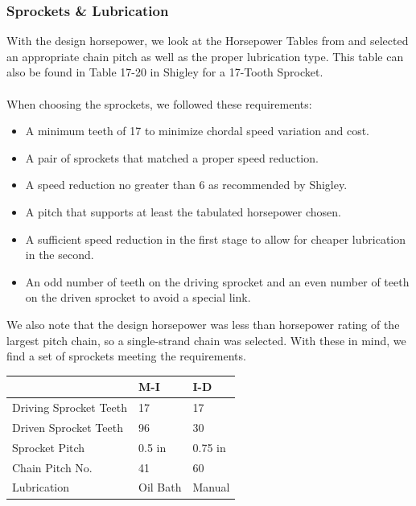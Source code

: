 \documentclass[letterpaper,12pt]{article}
\begin{document}
\subsubsection{Sprockets \& Lubrication}
With the design horsepower, we look at the Horsepower Tables from \cite{martin} and selected an appropriate chain pitch as well as the proper lubrication type. This table can also be found in Table 17-20 in Shigley for a 17-Tooth Sprocket.
\\\\
When choosing the sprockets, we followed these requirements:
\begin{itemize}
    \itemsep0em
    \item A minimum teeth of 17 to minimize chordal speed variation and cost.
    \item A pair of sprockets that matched a proper speed reduction.
    \item A speed reduction no greater than 6 as recommended by Shigley.
    \item A pitch that supports at least the tabulated horsepower chosen.
    \item A sufficient speed reduction in the first stage to allow for cheaper lubrication in the second.
    \item An odd number of teeth on the driving sprocket and an even number of teeth on the driven sprocket to avoid a special link.
\end{itemize}
We also note that the design horsepower was less than horsepower rating of the largest pitch chain, so a single-strand chain was selected. With these in mind, we find a set of sprockets meeting the requirements.
\begin{center}
	\begin{tabular}{|p{4cm}|p{1.5cm}|p{1.5cm}| }
		\hline
		& M-I & I-D \\
		\hline
		Driving Sprocket Teeth & 17 & 17\\
		Driven Sprocket Teeth & 96 & 30\\
		Sprocket Pitch & 0.5 in & 0.75 in\\
		Chain Pitch No. & 41 & 60 \\
		Lubrication & Oil Bath & Manual \\
		\hline
	\end{tabular}
\end{center}
\end{document}
